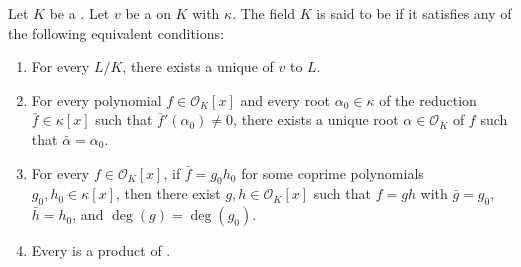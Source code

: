 \begin{definition} \label{definition:henselian_field_with_respect_to_a_valuation}
    Let $K$ be a . Let $v$ be a  on $K$ with  $\kappa$.
    The field $K$ is said to be  if it satisfies any of the following equivalent conditions:
    \begin{enumerate}
        \item For every  $L/K$, there exists a unique  of $v$ to $L$.

        \item For every polynomial $f \in \mathcal{O}_K[x]$ and every root $\alpha_0 \in \kappa$ of the reduction $\bar{f} \in \kappa[x]$ such that $\bar{f}'(\alpha_0) \neq 0$, there exists a unique root $\alpha \in \mathcal{O}_K$ of $f$ such that $\bar{\alpha} = \alpha_0$.  \item For every $f \in \mathcal{O}_K[x]$, if $\bar{f} = g_0 h_0$ for some coprime polynomials $g_0, h_0 \in \kappa[x]$, then there exist $g, h \in \mathcal{O}_K[x]$ such that $f = gh$ with $\bar{g} = g_0$, $\bar{h} = h_0$, and $\deg(g) = \deg(g_0)$.

        \item Every  is a product of .
    \end{enumerate}
\end{definition}